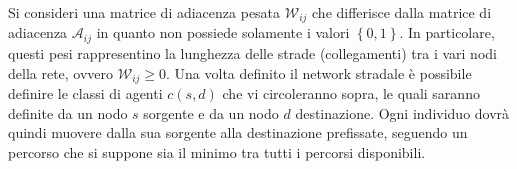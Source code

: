\documentclass[../main.tex]{subfiles}
\begin{document}
Si consideri una matrice di adiacenza pesata $\mathcal{W}_{ij}$ che differisce dalla matrice di adiacenza $\mathcal{A}_{ij}$ in quanto non possiede solamente i valori $\left\{0,1\right\}$.
In particolare, questi pesi rappresentino la lunghezza delle strade (collegamenti) tra i vari nodi della rete, ovvero $\mathcal{W}_{ij} \geq 0$.
Una volta definito il network stradale \`e possibile definire le classi di agenti $c(s,d)$ che vi circoleranno sopra, le quali saranno definite da un nodo $s$ sorgente e da un nodo $d$ destinazione.
Ogni individuo dovrà quindi muovere dalla sua sorgente alla destinazione prefissate, seguendo un percorso che si suppone sia il minimo tra tutti i percorsi disponibili.
\end{document}

